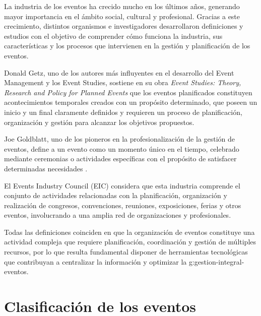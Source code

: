 La industria de los eventos ha crecido mucho en los últimos años,
generando mayor importancia en el ámbito social, cultural y profesional.
Gracias a este crecimiento, distintos organismos e investigadores
desarrollaron definiciones y estudios con el objetivo de comprender cómo
funciona la industria, sus características y los procesos que intervienen
en la gestión y planificación de los eventos.

Donald Getz, uno de los autores más influyentes en el desarrollo del
Event Management y los Event Studies, sostiene en su obra \emph{Event
Studies: Theory, Research and Policy for Planned Events}
\citep{getz2007} que los eventos
planificados constituyen acontecimientos temporales creados con un
propósito determinado, que poseen un inicio y un final claramente
definidos y requieren un proceso de planificación, organización y
gestión para alcanzar los objetivos propuestos.

Joe Goldblatt, uno de los pioneros en la profesionalización de la gestión
de eventos, define a un evento como un momento único en el tiempo,
celebrado mediante ceremonias o actividades específicas con el propósito
de satisfacer determinadas necesidades \citep{goldblatt2002}.

El Events Industry Council (EIC) \citep{eic} considera que esta industria
comprende el conjunto de actividades relacionadas con la planificación,
organización y realización de congresos, convenciones, reuniones,
exposiciones, ferias y otros eventos, involucrando a una amplia red de
organizaciones y profesionales.

Todas las definiciones coinciden en que la organización de eventos
constituye una actividad compleja que requiere planificación,
coordinación y gestión de múltiples recursos, por lo que resulta
fundamental disponer de herramientas tecnológicas que contribuyan a
centralizar la información y optimizar la \gls{g:gestion-integral-eventos}.

\section{Clasificación de los eventos}

